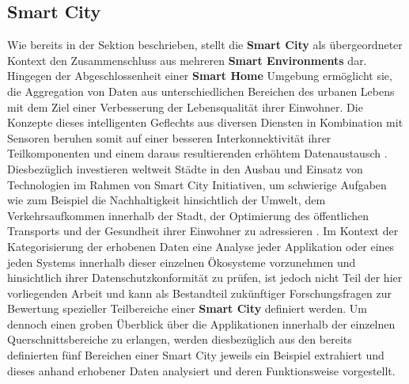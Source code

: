 \subsection{Smart City}
\label{sec:Analyse der Datenerhebung:ssec:Smart City}

Wie bereits in der Sektion  beschrieben, stellt die \textbf{Smart City} als übergeordneter Kontext den Zusammenschluss aus mehreren \textbf{Smart Environments} dar. Hingegen der Abgeschlossenheit einer \textbf{Smart Home} Umgebung ermöglicht sie, die Aggregation von Daten aus unterschiedlichen Bereichen des urbanen Lebens mit dem Ziel einer Verbesserung der Lebensqualität ihrer Einwohner. Die Konzepte dieses intelligenten Geflechts aus diversen Diensten in Kombination mit Sensoren beruhen somit auf einer besseren Interkonnektivität ihrer Teilkomponenten und einem daraus resultierenden erhöhtem Datenaustausch \cite{Stefanouli2019}. Diesbezüglich investieren weltweit Städte in den Ausbau und Einsatz von Technologien im Rahmen von Smart City Initiativen, um schwierige Aufgaben wie zum Beispiel die Nachhaltigkeit hinsichtlich der Umwelt, dem Verkehrsaufkommen innerhalb der Stadt, der Optimierung des öffentlichen Transports und der Gesundheit ihrer Einwohner zu adressieren \cite{BCG2020}.
Im Kontext der Kategorisierung der erhobenen Daten eine Analyse jeder Applikation oder eines jeden Systems innerhalb dieser einzelnen Ökosysteme vorzunehmen und hinsichtlich ihrer Datenschutzkonformität zu prüfen, ist jedoch nicht Teil der hier vorliegenden Arbeit und kann als Bestandteil zukünftiger Forschungsfragen zur Bewertung spezieller Teilbereiche einer \textbf{Smart City} definiert werden.
Um dennoch einen groben Überblick über die Applikationen innerhalb der einzelnen Querschnittsbereiche zu erlangen, werden diesbezüglich aus den bereits definierten fünf Bereichen einer Smart City jeweils ein Beispiel extrahiert und dieses anhand erhobener Daten analysiert und deren Funktionsweise vorgestellt.\\
